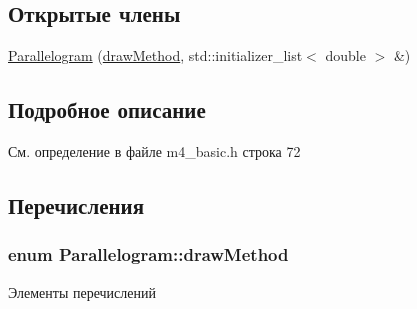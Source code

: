 \subsection*{Открытые члены}
\begin{DoxyCompactItemize}
\item 
\hyperlink{class_parallelogram_a430c0f9f5ed2cf85e4c3c2e961be7c2d}{Parallelogram} (\hyperlink{class_multyline_ad75d7bb224267d0d7b4c40fd72a1d920}{draw\-Method}, std\-::initializer\-\_\-list$<$ double $>$ \&)
\end{DoxyCompactItemize}


\subsection{Подробное описание}


См. определение в файле m4\-\_\-basic.\-h строка 72



\subsection{Перечисления}
\hypertarget{class_parallelogram_aeae756ed193db05daf0aeb3d0a0966b0}{
\subsubsection[{draw\-Method}]{\setlength{\rightskip}{0pt plus 5cm}enum {\bf Parallelogram\-::draw\-Method}}}\label{class_parallelogram_aeae756ed193db05daf0aeb3d0a0966b0}
\begin{Desc}
\item[Элементы перечислений]\par
\begin{description}
\item[{\em 
\hypertarget{class_parallelogram_aeae756ed193db05daf0aeb3d0a0966b0a8da001730608d2059c34abe87159e366}{point3}\label{class_parallelogram_aeae756ed193db05daf0aeb3d0a0966b0a8da001730608d2059c34abe87159e366}
}]\item[{\em 
\hypertarget{class_parallelogram_aeae756ed193db05daf0aeb3d0a0966b0a1120a1b801f1081028e8345091b6c0b6}{point2}\label{class_parallelogram_aeae756ed193db05daf0aeb3d0a0966b0a1120a1b801f1081028e8345091b6c0b6}
}]\item[{\em 
\hypertarget{class_parallelogram_aeae756ed193db05daf0aeb3d0a0966b0a1038e30d507cb7f800b0b3698312be0e}{point1}\label{class_parallelogram_aeae756ed193db05daf0aeb3d0a0966b0a1038e30d507cb7f800b0b3698312be0e}
}]\end{description}
\end{Desc}


